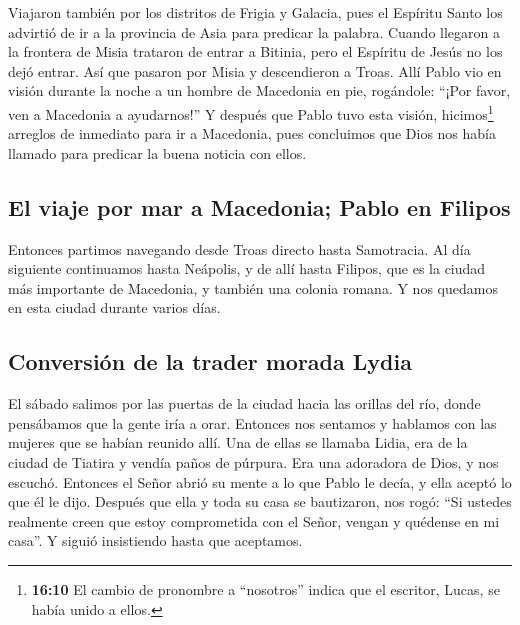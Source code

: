  Viajaron también por los distritos de Frigia y Galacia,
pues el Espíritu Santo los advirtió de ir a la provincia de Asia para
predicar la palabra.  Cuando llegaron a la frontera de
Misia trataron de entrar a Bitinia, pero el Espíritu de Jesús no los
dejó entrar.  Así que pasaron por Misia y descendieron a
Troas.  Allí Pablo vio en visión durante la noche a un
hombre de Macedonia en pie, rogándole: ``¡Por favor, ven a Macedonia a
ayudarnos!''  Y después que Pablo tuvo esta visión,
hicimos\footnote{\textbf{16:10} El cambio de pronombre a ``nosotros''
  indica que el escritor, Lucas, se había unido a ellos.} arreglos de
inmediato para ir a Macedonia, pues concluimos que Dios nos había
llamado para predicar la buena noticia con ellos.

\hypertarget{el-viaje-por-mar-a-macedonia-pablo-en-filipos}{%
\subsection{El viaje por mar a Macedonia; Pablo en
Filipos}\label{el-viaje-por-mar-a-macedonia-pablo-en-filipos}}

 Entonces partimos navegando desde Troas directo hasta
Samotracia. Al día siguiente continuamos hasta Neápolis, 
y de allí hasta Filipos, que es la ciudad más importante de Macedonia, y
también una colonia romana. Y nos quedamos en esta ciudad durante varios
días.

\hypertarget{conversiuxf3n-de-la-trader-morada-lydia}{%
\subsection{Conversión de la trader morada
Lydia}\label{conversiuxf3n-de-la-trader-morada-lydia}}

 El sábado salimos por las puertas de la ciudad hacia las
orillas del río, donde pensábamos que la gente iría a orar. Entonces nos
sentamos y hablamos con las mujeres que se habían reunido allí.
 Una de ellas se llamaba Lidia, era de la ciudad de
Tiatira y vendía paños de púrpura. Era una adoradora de Dios, y nos
escuchó. Entonces el Señor abrió su mente a lo que Pablo le decía, y
ella aceptó lo que él le dijo.  Después que ella y toda
su casa se bautizaron, nos rogó: ``Si ustedes realmente creen que estoy
comprometida con el Señor, vengan y quédense en mi casa''. Y siguió
insistiendo hasta que aceptamos.

